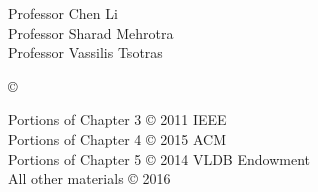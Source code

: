 \documentclass[12pt,fleqn]{ucithesis}
\begin{document}




\othercommitteemembers
{
Professor Chen Li \\
Professor Sharad Mehrotra \\
Professor Vassilis Tsotras
}


\copyrightdeclaration
{
{\copyright} {\Degreeyear} \Authorname
}

\prepublishedcopyrightdeclaration
{
Portions of Chapter 3 {\copyright} 2011 IEEE \\
Portions of Chapter 4 {\copyright} 2015 ACM \\
Portions of Chapter 5 {\copyright} 2014 VLDB Endowment \\
All other materials {\copyright} 2016 \Authorname
}

\end{document}

